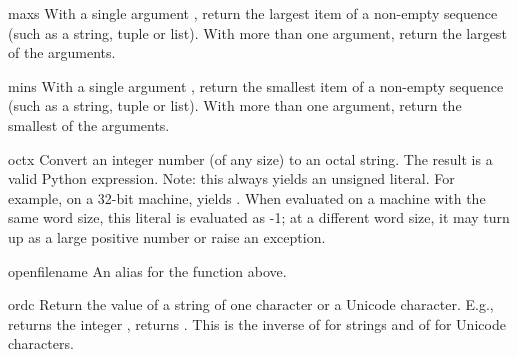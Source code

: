 \begin{funcdesc}{max}{s}
  With a single argument , return the largest item of a
  non-empty sequence (such as a string, tuple or list).  With more
  than one argument, return the largest of the arguments.
\end{funcdesc}

\begin{funcdesc}{min}{s}
  With a single argument , return the smallest item of a
  non-empty sequence (such as a string, tuple or list).  With more
  than one argument, return the smallest of the arguments.
\end{funcdesc}

\begin{funcdesc}{oct}{x}
  Convert an integer number (of any size) to an octal string.  The
  result is a valid Python expression.  Note: this always yields an
  unsigned literal.  For example, on a 32-bit machine, 
  yields .  When evaluated on a machine with the
  same word size, this literal is evaluated as -1; at a different word
  size, it may turn up as a large positive number or raise an
   exception.
\end{funcdesc}

\begin{funcdesc}{open}{filename}
  An alias for the  function above.
\end{funcdesc}

\begin{funcdesc}{ord}{c}
  Return the \ASCII{} value of a string of one character or a Unicode
  character.  E.g.,  returns the integer ,
   returns .  This is the inverse of
   for strings and of  for Unicode
  characters.
\end{funcdesc}

